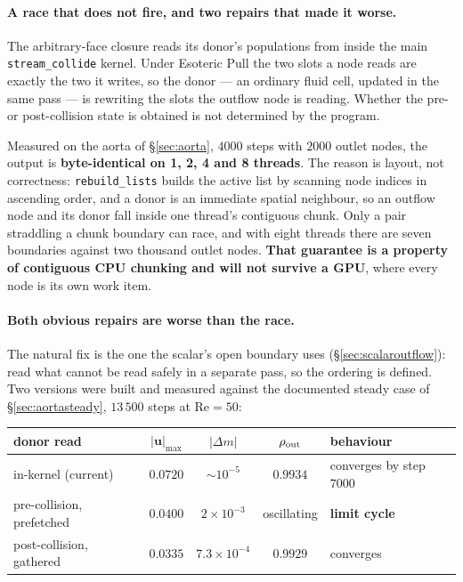 \documentclass[11pt,a4paper]{article}
\newcommand{\uu}{\bm{u}}
\newcommand{\e}[1]{\times 10^{#1}}
\begin{document}
\paragraph{A race that does not fire, and two repairs that made it worse.}
\label{sec:outflowrace}
The arbitrary-face closure reads its donor's populations from inside the main
\texttt{stream\_collide} kernel. Under Esoteric Pull the two slots a node reads
are exactly the two it writes, so the donor --- an ordinary fluid cell, updated
in the same pass --- is rewriting the slots the outflow node is reading. Whether
the pre- or post-collision state is obtained is not determined by the program.

Measured on the aorta of \S\ref{sec:aorta}, $4000$ steps with $2000$ outlet
nodes, the output is \textbf{byte-identical on 1, 2, 4 and 8 threads}. The
reason is layout, not correctness: \texttt{rebuild\_lists} builds the active
list by scanning node indices in ascending order, and a donor is an immediate
spatial neighbour, so an outflow node and its donor fall inside one thread's
contiguous chunk. Only a pair straddling a chunk boundary can race, and with
eight threads there are seven boundaries against two thousand outlet nodes.
\textbf{That guarantee is a property of contiguous CPU chunking and will not
survive a GPU}, where every node is its own work item.

\paragraph{Both obvious repairs are worse than the race.} The natural fix is the
one the scalar's open boundary uses (\S\ref{sec:scalaroutflow}): read what
cannot be read safely in a separate pass, so the ordering is defined. Two
versions were built and measured against the documented steady case of
\S\ref{sec:aortasteady}, $13\,500$ steps at $\mathrm{Re}=50$:

\begin{center}\small
\begin{tabular}{lcccl}
\toprule
donor read & $|\uu|_{\max}$ & $|\Delta m|$ & $\rho_{\rm out}$ & behaviour \\
\midrule
in-kernel (current) & $0.0720$ & $\sim\!10^{-5}$ & $0.9934$ & converges by step $7000$ \\
pre-collision, prefetched & $0.0400$ & $2\e{-3}$ & oscillating & \textbf{limit cycle} \\
post-collision, gathered & $0.0335$ & $7.3\e{-4}$ & $0.9929$ & converges \\
\bottomrule
\end{tabular}
\end{center}
\end{document}
